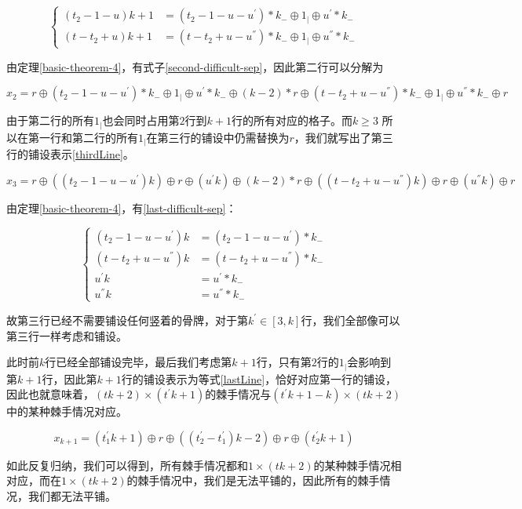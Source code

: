 $$
    \left\{
    \begin{aligned}
        (t_2 - 1 - u)k + 1 & = (t_2 - 1 - u - u^{'}) * k_{-} \oplus 1_{\vert} \oplus u^{'} *  k_{-}     \\
        (t - t_2 + u)k + 1 & = (t - t_2 + u - u^{''}) *  k_{-} \oplus 1_{\vert} \oplus  u^{''} *  k_{-}
        \label{second-difficult-sep}
    \end{aligned}
    \right.
$$

由定理\ref*{basic-theorem-4}，有式子\ref*{second-difficult-sep}，因此第二行可以分解为

$x_2 =  r \oplus  (t_2- 1 - u - u^{'}) * k_{-} \oplus 1_{\vert} \oplus  u^{'} * k_{-}  \oplus (k - 2) * r \oplus (t - t_2 + u - u^{''}) * k_{-} \oplus 1_{\vert} \oplus  u^{''} * k_{-} \oplus r$

由于第二行的所有$1_{\vert}$也会同时占用第$2$行到$k + 1$行的所有对应的格子。而$k \ge 3$ 所以在第一行和第二行的所有$1_{\vert}$在第三行的铺设中仍需替换为$r$，我们就写出了第三行的铺设表示\ref{thirdLine}。

\begin{equation}
    x_3 =  r \oplus  ((t_2- 1 - u - u^{'})k) \oplus r \oplus  (u^{'}k) \oplus (k - 2) * r \oplus
    ((t - t_2 + u - u^{''})k) \oplus r \oplus  (u^{''}k) \oplus r
    \label{thirdLine}
\end{equation}

由定理\ref*{basic-theorem-4}，有\ref*{last-difficult-sep}：

$$
    \left\{
    \begin{aligned}
        (t_2 - 1 - u - u^{'})k  & = (t_2- 1 - u - u^{'}) * k_{-}   \\
        (t - t_2 + u - u^{''})k & = (t - t_2 + u - u^{''}) * k_{-} \\
        u^{'}k                  & = u^{'} * k_{-}                  \\
        u^{''}k                 & = u^{''} * k_{-}
        \label{last-difficult-sep}
    \end{aligned}
    \right.
$$

故第三行已经不需要铺设任何竖着的骨牌，对于第$k^{'}\in [3, k]$行，我们全部像可以第三行一样考虑和铺设。

此时前$k$行已经全部铺设完毕，最后我们考虑第$k + 1$行，只有第$2$行的$1_{\vert}$会影响到第$k+1$行，因此第$k+1$行的铺设表示为等式\ref{lastLine}，恰好对应第一行的铺设，因此也就意味着，$(tk + 2) \times (t^{'}k + 1)$的棘手情况与$(t^{'}k + 1 - k) \times (tk + 2)$中的某种棘手情况对应。

\begin{equation}
    x_{k+1} =  (t^{'}_1k + 1) \oplus r \oplus  ((t^{'}_2 - t^{'}_1)k - 2) \oplus r \oplus  (t^{'}_2k + 1)
    \label{lastLine}
\end{equation}

如此反复归纳，我们可以得到，所有棘手情况都和$1 \times (tk + 2)$的某种棘手情况相对应，而在$1 \times (tk + 2)$的棘手情况中，我们是无法平铺的，因此所有的棘手情况，我们都无法平铺。

\clearpage